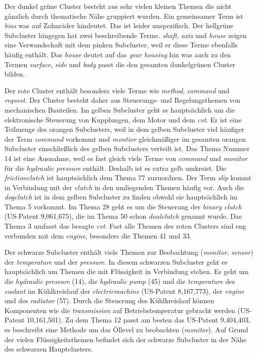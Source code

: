 Der dunkel grüne Cluster besteht aus sehr vielen kleinen Themen die nicht gänzlich durch thematische Nähe gruppiert wurden. Ein gemeinsamer Term ist \emph{bias} was auf Zahnräder hindeutet. Das ist leider unspezifisch. Der hellgrüne Subcluster hingegen hat zwei beschreibende Terme. \emph{shaft}, \emph{axis} und \emph{house} zeigen eine Verwandschaft mit dem pinken Subcluster, weil er diese Terme ebenfalls häufig enthält. Das \emph{house} deutet auf das \emph{gear housing} hin was auch zu den Termen \emph{surface}, \emph{side} und \emph{body} passt die den gesamten dunkelgrünen Cluster bilden.


Der rote Cluster enthält besonders viele Terme wie \emph{method}, \emph{command} und \emph{request}. Der Cluster besteht daher aus Steuerungs- und Regelungsthemen von mechanischen Bauteilen. Im gelben Subcluster geht es hauptsächlich um die elektronische Steuerung von Kupplungen, dem Motor und dem \emph{\gls{cvt}}. Er ist eine Teilmenge des orangen Subclusters, weil in dem gelben Subcluster viel häufiger der Term \emph{command} vorkommt und \emph{montior} gleichmäßiger im gesamten orangen Subcluster einschließlich des gelben Subclusters verteilt ist. Das Thema Nummer 14 ist eine Ausnahme, weil es fast gleich viele Terme von \emph{command} und \emph{monitor} für die \emph{hydraulic} \emph{pressure} enthält. Deshalb ist es extra gelb umkreist. Die \emph{frictionclutch} ist hauptsächlich dem Thema 77 zuzuordnen. Der Term \emph{slip} kommt in Verbindung mit der \emph{clutch} in den umliegenden Themen häufig vor. Auch die \emph{dogclutch} ist in dem gelben Subcluster zu finden obwohl sie hauptsächlich im Thema 5 vorkommt. Im Thema 28 geht es um die Steuerung der \emph{binary} \emph{clutch} (US-Patent 9,061,675), die im Thema 50 schon \emph{dualclutch} genannt wurde. Das Thema 3 umfasst das besagte \emph{\gls{cvt}}. Fast alle Themen des roten Clusters sind eng verbunden mit dem \emph{engine}, besonders die Themen 41 und 33. 


Der schwarze Subcluster enthält viele Themen zur Beobachtung (\emph{monitor}, \emph{sensor}) der \emph{temperature} und der \emph{pressure}. In diesem schwarzen Subcluster geht es hauptsächlich um Themen die mit Flüssigkeit in Verbindung stehen. Es geht um die \emph{hydraulic} \emph{pressure} (14), die \emph{hydraulic} \emph{pump} (45) und die \emph{temperature} des \emph{coolant} im Kühlkreislauf der \emph{electricmachine} (US-Patent 8,167,773), der \emph{engine} und des \emph{radiator} (57). Durch die Steuerung des Kühlkreislauf können Komponenten wie die \emph{transmission} auf Betriebstemperatur gebracht werden (US-Patent 10,161,501). Zu dem Thema 12 passt am besten das US-Patent 9,404,403, es beschreibt eine Methode um das Öllevel zu beobachten (\emph{monitor}). Auf Grund der vielen Flüssigkeitsthemen befindet sich der schwarze Subcluster in der Nähe des schwarzen Hauptclusters.


